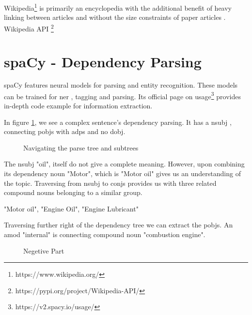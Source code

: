 Wikipedia\footnote{https://www.wikipedia.org/} is primarily an encyclopedia with the additional benefit of heavy linking between articles and without the size constraints of paper articles \cite{TorstenZesch}. Wikipedia API \footnote{https://pypi.org/project/Wikipedia-API/}

\section{spaCy - Dependency Parsing}

spaCy \cite{spacy2} features neural models for parsing and entity recognition. These models can be trained for \acf{ner} , tagging and parsing. Its official page on usage\footnote {https://v2.spacy.io/usage/} provides in-depth code example for information extraction.

In figure \ref{fig:dp}, we see a complex sentence's dependency parsing. It has a \acf{nsubj} , connecting \acfp{pobj} with \acfp{adp} and no \acf{dobj}.

\begin{figure}[htp!]
    \centering    
    
    \caption{Navigating the parse tree and subtrees}
    \label{fig:dp}
\end{figure}

The \acs{nsubj} "oil", itself do not give a complete meaning. However, upon combining its dependency noun "Motor", which is "Motor oil"  gives us an understanding of the topic. Traversing from \acs{nsubj} to  \acfp{conj} provides us with three related compound nouns belonging to a similar group.

"Motor oil", "Engine Oil", "Engine Lubricant"

Traversing further right of the dependency tree we can extract the \acsp{pobj}.  An \acf{amod} "internal" is connecting compound noun "combustion engine".

\begin{figure}[htp!]
    \centering    
    
    \caption{Negetive Part}
    \label{fig:vp}
\end{figure}
